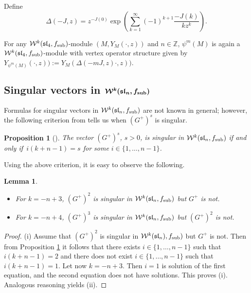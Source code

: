 \documentclass[pdftex]{sigma}
\numberwithin{equation}{section}
\newtheorem{Lemma}[Theorem]{Lemma}
\newtheorem{Proposition}[Theorem]{Proposition}
\begin{document}
Define
 \[
 \Delta (-J,z) = z^{-J(0)}\exp \left ( \sum _{k=1} ^{\infty} (-1)^{k+1}\frac{-J(k)}{kz^k}\right ).
 \]

For any $\mathcal{W}^k(\mathfrak{sl}_4, f_{\rm sub})$-module $(M, Y_M(\cdot, z))$ and $n \in \mathbb{Z}$,
$\psi^m (M)$ is again a $\mathcal{W}^k(\mathfrak{sl}_4, f_{\rm sub})$-module with vertex operator structure given by
$ Y_{\psi^m (M) } ( \cdot , z)) := Y_{ M } (\Delta ( -m J, z) \cdot , z))$.

\subsection[Singular vectors in W\^{}k(sl\_n, f\_sub)]{Singular vectors in $\boldsymbol{\mathcal{W}^k(\mathfrak{sl}_n, f_{\rm sub})}$}
	
	Formulas for singular vectors in $\mathcal{W}^k(\mathfrak{sl}_n, f_{\rm sub})$ are not known in general; however, the following criterion from \cite{Feh} tells us when $(G^+)^s$ is singular.
	
	\begin{Proposition}[\cite{Feh}]\label{kriterij}
		The vector $(G^+)^s$, $s>0$, is singular in $\mathcal{W}^k(\mathfrak{sl}_n, f_{\rm sub})$ if and only if~${
		 	i(k+n-1)=s}
$
 for some $i \in \{1,\dots ,n-1 \}$.
	\end{Proposition}

Using the above criterion, it is easy to observe the following.
	\begin{Lemma} \label{sing_G^+}\qquad
	\begin{itemize}\itemsep=0pt
		\item[$(i)$] For $k=-n+3$, $(G^+)^2$ is singular in $\mathcal{W}^k(\mathfrak{sl}_n, f_{\rm sub})$ but $G^+$ is not.
		\item[$(ii)$] For $k=-n+4$, $(G^+)^3$ is singular in $\mathcal{W}^k(\mathfrak{sl}_n, f_{\rm sub})$ but $(G^+)^2$ is not.	
	\end{itemize}
	\end{Lemma}
	
	\begin{proof}
		(i) Assume that $(G^+)^2$ is singular in $\mathcal{W}^k(\mathfrak{sl}_n), f_{\rm sub})$ but $G^+$ is not. Then from Proposition \ref{kriterij} it follows that there exists $i \in \{1,\dots ,n-1 \}$ such that $ i(k+n-1)=2 $ and there does not exist $i \in \{1,\dots ,n-1 \}$ such that $ i(k+n-1)=1$. Let now $k=-n+3$. Then $i=1$ is solution of the first equation, and the second equation does not have solutions. This proves (i).
		Analogous reasoning yields (ii).
	\end{proof}
	
\end{document}
